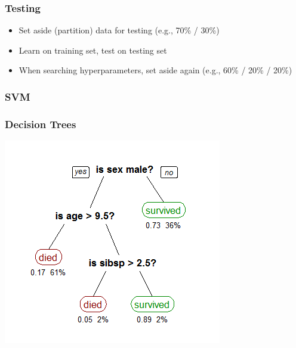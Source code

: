 \begin{frame}
  \frametitle{Testing}
  \begin{itemize}
  \item Set aside (partition) data for testing (e.g., 70\% / 30\%)
  \item Learn on training set, test on testing set
  \item When searching hyperparameters, set aside again (e.g., 60\% / 20\% / 20\%)
  \end{itemize}
\end{frame}


\begin{frame}
  \frametitle{SVM}
\end{frame}


\begin{frame}
  \frametitle{Decision Trees}
  \centerline{\includegraphics[height=.9\textheight]{../J-0x03/tree_titanic_survivors.png}}

    \vspace{-28mm}\parbox{.4\textwidth}{}

\end{frame}


